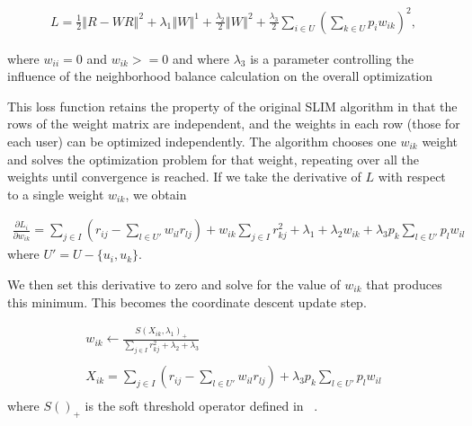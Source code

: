 \begin{equation}
\begin{split}
 L = \frac{1}{2}\left\Vert R - WR \right\Vert^2 + 
    \lambda_1 \left\Vert W \right\Vert^1 + 
    \frac{\lambda_2}{2}\left\Vert W \right\Vert^2 +
    \frac{\lambda_3}{2}\sum_{i \in U}\left(\sum_{k \in U}p_iw_{ik}\right)^2,
\end{split}
\end{equation}
\vspace{0.25cm}

where $w_{ii}=0$ and $w_{ik}>=0$ and where $\lambda_3$ is a parameter controlling the influence of the neighborhood balance calculation on the overall optimization

This loss function retains the property of the original SLIM algorithm in that the rows of the weight matrix are independent, and the weights in each row (those for each user) can be optimized independently. The algorithm chooses one $w_{ik}$ weight and solves the optimization problem for that weight, repeating over all the weights until convergence is reached. If we take the derivative of $L$ with respect to a single weight $w_{ik}$, we obtain

\begin{equation}\label{eq:derivative}
\begin{split}
\frac{\partial L_i}{\partial w_{ik}} = \sum_{j \in I}{(r_{ij} - 
    \sum_{l \in U'}{w_{il}r_{lj}})} + w_{ik}\sum_{j \in I}{r_{kj}^2} + 
    \lambda_1 + \lambda_2w_{ik} + \lambda_3p_k\sum_{l \in U'}{p_lw_{il}} 
\end{split}
\end{equation}
where $U' = U - \{u_i, u_k\}$.
\vspace{0.25cm}

We then set this derivative to zero and solve for the value of $w_{ik}$ that produces this minimum. This becomes the coordinate descent update step. 

\begin{equation}\label{eq:update}
\begin{split}
    w_{ik} \leftarrow \frac{S\left(X_{ik}, \lambda_1\right)_+}
    {\sum_{j \in I}{r_{kj}^2} + \lambda_2 + \lambda_3} \\ \\
    X_{ik} = \sum_{j \in I}{(r_{ij} - 
    \sum_{l \in U'}{w_{il}r_{lj}})}+\lambda_3p_k\sum_{l \in U'}{p_lw_{il}}\\
\end{split}
\end{equation}
where $S()_+$ is the soft threshold operator defined in ~\cite{friedman_pathwise_2007}.
\vspace{0.25cm}

